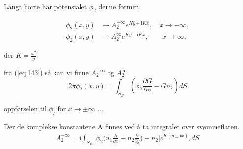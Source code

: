 Langt borte har potensialet $\phi_2$  denne formen

\begin{align}
	\phi_2(\bar{x},\bar{y}) &\rightarrow A_2^{-\infty} e^{K\bar{y} + \mathrm{i} K\bar{x}}, \quad \bar{x} \rightarrow -\infty, \\
	\phi_2(\bar{x},\bar{y}) &\rightarrow A_2^{\infty} e^{K\bar{y} - \textsf{i} K\bar{x}}, \qquad \bar{x} \rightarrow \infty,
\end{align}

der $K = \frac{\omega^2}{g}$

fra (\ref{eq:143}) så kan vi finne $A_2^{-\infty}$ og $A_2^{\infty}$
\begin{equation}
    2\pi \phi_2(\bar{x},\bar{y})  = \int_{S_B}  ( \phi_2  \frac{\partial G }{\partial n}-G n_2 )dS
\end{equation}

oppførselen til $\phi_j$ for $\bar{x} \rightarrow \pm \infty$
...

Der de komplekse konstantene A finnes ved å ta integralet over svømmeflaten.
\begin{align}
A_2^{\pm \infty} =  \mathrm{i} \int_{S_B}   \bigg[ \phi_2  \Big(  n_1 \frac{\partial }{\partial x}  +  n_2\frac{\partial }{\partial y} \Big) - n_2 \bigg]  e^{K (\bar{y} \pm \mathrm{i}  \bar{x}) },dS
\end{align}



